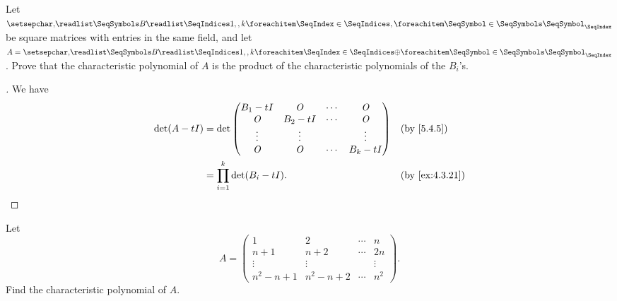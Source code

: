 \begin{ex}\label{ex:5.4.40}
	Let \(\seq{B}{1,,k}\) be square matrices with entries in the same field, and let \(A = \seq[\oplus]{B}{1,,k}\).
	Prove that the characteristic polynomial of \(A\) is the product of the characteristic polynomials of the \(B_i\)'s.
\end{ex}

\begin{proof}[]
	We have
	\begin{align*}
		\det(A - t I) & = \det\begin{pmatrix}
			                      B_1 - t I & \zm       & \cdots & \zm       \\
			                      \zm       & B_2 - t I & \cdots & \zm       \\
			                      \vdots    & \vdots    &        & \vdots    \\
			                      \zm       & \zm       & \cdots & B_k - t I
		                      \end{pmatrix} &  & \by{5.4.5}                  \\
		              & = \prod_{i = 1}^k \det(B_i - t I).            &  & \by{ex:4.3.21}
	\end{align*}
\end{proof}

\begin{ex}\label{ex:5.4.41}
	Let
	\[
		A = \begin{pmatrix}
			1           & 2           & \cdots & n      \\
			n + 1       & n + 2       & \cdots & 2n     \\
			\vdots      & \vdots      &        & \vdots \\
			n^2 - n + 1 & n^2 - n + 2 & \cdots & n^2
		\end{pmatrix}.
	\]
	Find the characteristic polynomial of \(A\).
\end{ex}

